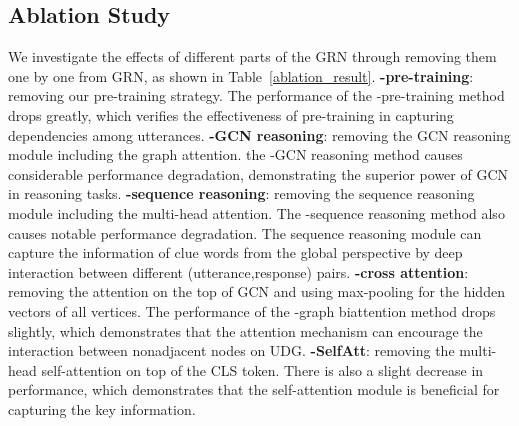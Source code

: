\documentclass[letterpaper]{article} %
\begin{document}
\subsection{Ablation Study}
We investigate the effects of different parts of the GRN through removing them one by one from GRN, as shown in Table~\ref{ablation_result}. \textbf{-pre-training}: removing our pre-training strategy. The performance of the -pre-training method drops greatly, which verifies the effectiveness of pre-training in capturing dependencies among utterances. \textbf{-GCN reasoning}: removing the GCN reasoning module including the graph attention. the -GCN reasoning method causes considerable performance degradation, demonstrating the superior power of GCN in reasoning tasks. \textbf{-sequence reasoning}: removing the sequence reasoning module including the multi-head attention. The -sequence reasoning method also causes notable performance degradation. The sequence reasoning module can capture the information of clue words from the global perspective by deep interaction between different (utterance,response) pairs. \textbf{-cross attention}: removing the attention on the top of GCN and using max-pooling for the hidden vectors of all vertices. The performance of the -graph biattention method drops slightly, which demonstrates that the attention mechanism can encourage the interaction between nonadjacent nodes on UDG. \textbf{-SelfAtt}: removing the multi-head self-attention on top of the CLS token. There is also a slight decrease in performance, which demonstrates that the self-attention module is beneficial for capturing the key information.
\end{document}

